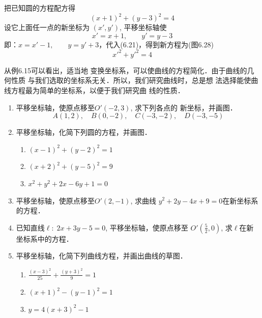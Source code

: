 \begin{solution}
    把已知圆的方程配方得
\begin{equation}
    (x+1)^2+(y-3)^2=4
\end{equation}
设它上面任一点的新坐标为
$(x',y')$, 平移坐标轴使
\[x'=x+1,\qquad y'=y-3\]
即：$x=x'-1,\qquad y=y'+3$，代入(6.21)，得到新方程为(图6.28)
\[{x'}^2+{y'}^2=4\]
\end{solution}

\begin{figure}[htp]
    \centering
{}
    \caption{}
\end{figure}


从例6.15可以看出，适当地
变换坐标系，可以使曲线的方程简化．由于曲线的几何性质
与我们选取的坐标系无关．所以，我们研究曲线时，总是想
法选择能使曲线方程最为简单的坐标系，以便于我们研究曲
线的性质．

\begin{ex}
\begin{enumerate}
    \item 平移坐标轴，使原点移至$O'(-2,3)$, 求下列各点的
    新坐标，并画图．
\[    A(1,2),\quad B(0,-2),\quad  C(-3,-2),\quad D(-3,-5)\]
    \item 平移坐标轴，化简下列圆的方程，并画图．
\begin{enumerate}
    \item $(x-1)^2+(y-2)^2=1$
    \item $(x+2)^2+(y-5)^2=9$
    \item $x^2+y^2+2x-6y+1=0$
\end{enumerate}

    \item 平移坐标轴，使原点移至$O'(2,-1)$, 求曲线
    $y^2+2y-4x+9=0$在新坐标系的方程．
    \item 已知直线$\ell:\; 2x+3y-5=0$, 平移坐标轴，使原点移至
    $O'\left(\frac{5}{2},0\right)$, 
求$\ell$在新坐标系中的方程．
\item 平移坐标轴，化简下列曲线方程，并画出曲线的草图．
\begin{enumerate}
    \item $\frac{(x-3)^2}{25}+\frac{(y+3)^2}{9}=1$
    \item $(x+1)^2-(y-1)^2=1$
    \item $y=4(x+3)^2-1$
\end{enumerate}
\end{enumerate}
\end{ex}

